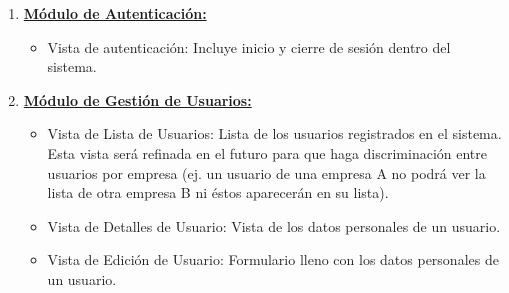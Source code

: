     \begin{enumerate}
        \item \textbf{\underline{Módulo de Autenticación:}}
        
        \begin{itemize}
            \item Vista de autenticación: Incluye inicio y cierre de sesión dentro del sistema.
        \end{itemize}
        
        \item \textbf{\underline{Módulo de Gestión de Usuarios:}}
        
        \begin{itemize}
            \item Vista de Lista de Usuarios: Lista de los usuarios registrados en el sistema. Esta vista será refinada en el futuro para que haga discriminación entre usuarios por empresa (ej. un usuario de una empresa A no podrá ver la lista de otra empresa B ni éstos aparecerán en su lista).
            \item Vista de Detalles de Usuario: Vista de los datos personales de un usuario.
            \item Vista de Edición de Usuario: Formulario lleno con los datos personales de un usuario.
        \end{itemize}
        
        

\end{enumerate}
